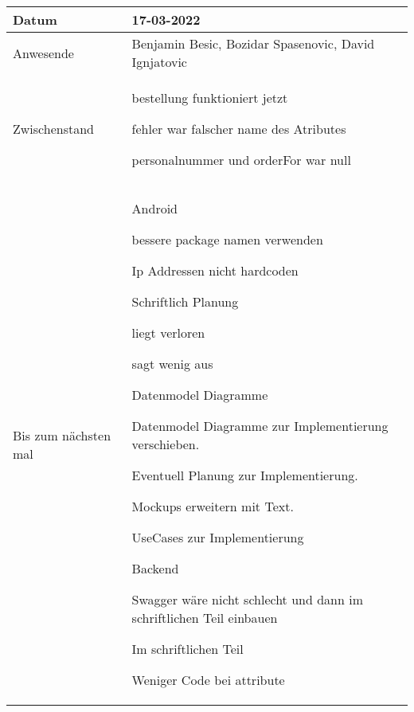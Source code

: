 \begin{center}
    \begin{tabular}{ |p{3cm}|p{10cm}|   }
        \hline
        Datum & 17-03-2022\\
        \hline
        Anwesende & Benjamin Besic, Bozidar Spasenovic, David Ignjatovic\\

        \hline
        Zwischenstand& 



        bestellung funktioniert jetzt

        fehler war falscher name des Atributes

        personalnummer und orderFor war null



    \\
        \hline
        Bis zum nächsten mal &  Android

        bessere package namen verwenden
    
        Ip Addressen nicht hardcoden
    
     Schriftlich
     Planung
    
        liegt verloren
    
        sagt wenig aus
    
        Datenmodel Diagramme
    
        Datenmodel Diagramme zur Implementierung verschieben.
    
        Eventuell Planung zur Implementierung.
    
        Mockups erweitern mit Text.
    
        UseCases zur Implementierung
    
     Backend
    
        Swagger wäre nicht schlecht und dann im schriftlichen Teil einbauen
    
        Im schriftlichen Teil
    
            Weniger Code bei attribute
    
    \\
        \hline
    \end{tabular}
\end{center}

